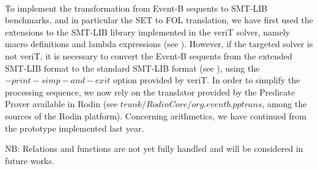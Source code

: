 \paragraph{}
To implement the transformation from Event-B sequents to SMT-LIB benchmarks, and in particular the SET to FOL translation, we have first used the extensions to the SMT-LIB library implemented in the veriT solver, namely macro definitions and lambda expressions (see \cite{BSMT10}). However, if the targeted solver is not veriT, it is necessary to convert the Event-B sequents from the extended SMT-LIB format to the standard SMT-LIB format (see \cite{RODINSMT10}), using the $-print-simp-and-exit$ option provided by veriT.
In order to simplify the processing sequence, we now rely on the translator provided by the Predicate Prover available in Rodin (see $trunk/RodinCore/org.eventb.pptrans$, among the sources\cite{SOURCES} of the Rodin platform). 
Concerning arithmetics, we have continued from the prototype\cite{B2SMT09} implemented last year.

NB: Relations and functions are not yet fully handled and will be considered in future works.
